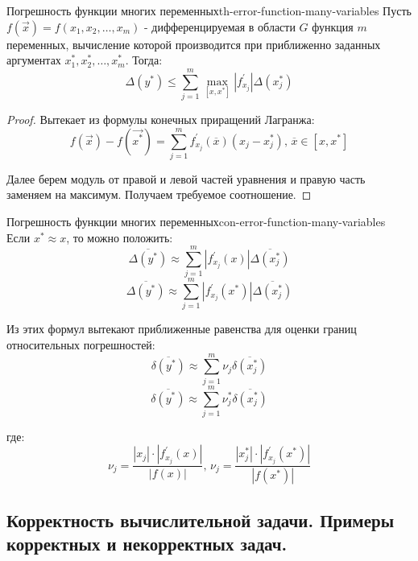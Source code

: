 \documentclass[14pt]{extarticle}
\begin{document}
        \begin{theorem}{Погрешность функции многих переменных}{th-error-function-many-variables}
            Пусть $f(\vec{x}) = f(x_{1}, x_{2}, \ldots, x_{m})$ - дифференцируемая в области $G$ функция $m$ переменных, вычисление которой производится при приближенно заданных аргументах $x_{1}^{*}, x_{2}^{*}, \ldots, x_{m}^{*}$. Тогда:
            $$\Delta(y^{*}) \leq \sum_{j=1}^{m} \max_{[x, x^{*}]} |f_{x_{j}}^{'}|\Delta(x_{j}^{*})$$
        
            \begin{proof}
                Вытекает из формулы конечных приращений Лагранжа:\\
                $$f(\vec{x}) - f(\vec{x^{*}}) = \sum_{j=1}^{m} f_{x_{j}}^{'}(\overline{x})(x_{j} - x_{j}^{*}) \text{, } \overline{x} \in [x, x^{*}]$$
                
                Далее берем модуль от правой и левой частей уравнения и правую часть заменяем на максимум. Получаем требуемое соотношение.
            \end{proof}
        \end{theorem}

        \begin{consequence}{Погрешность функции многих переменных}{con-error-function-many-variables}
            Если $x^{*} \approx x$, то можно положить:
            $$\overline{\Delta(y^{*})} \approx \sum_{j=1}^{m}|f_{x_{j}}^{'}(x)|\overline{\Delta(x_{j}^{*})}$$
            $$\overline{\Delta(y^{*})} \approx \sum_{j=1}^{m}|f_{x_{j}}^{'}(x^{*})|\overline{\Delta(x_{j}^{*})}$$
        
            \vspace{\baselineskip}
        
            Из этих формул вытекают приближенные равенства для оценки границ относительных погрешностей:
            $$\overline{\delta(y^{*})} \approx \sum_{j=1}^{m} \nu_{j}\overline{\delta(x_{j}^{*})}$$
            $$\overline{\delta(y^{*})} \approx \sum_{j=1}^{m} \nu_{j}^{*}\overline{\delta(x_{j}^{*})}$$
        
            где:
            $$\nu_{j} = \frac{|x_{j}|\cdot|f_{x_{j}}^{'}(x)|}{|f(x)|} \text{, } \nu_{j} = \frac{|x_{j}^{*}|\cdot|f_{x_{j}}^{'}(x^{*})|}{|f(x^{*})|}$$
        \end{consequence}

\clearpage
\subsection{Корректность вычислительной задачи. Примеры корректных и некорректных задач.}
    
\end{document}
